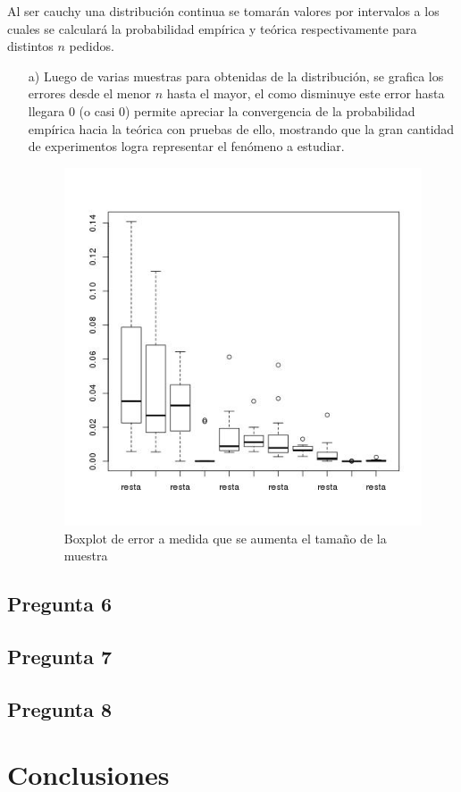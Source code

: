 \documentclass[letter,10pt]{article}
\begin{document}
Al ser cauchy una distribución continua se tomarán valores por intervalos a los cuales se calculará la probabilidad
empírica y teórica respectivamente para distintos $n$ pedidos.
\begin{itemize}
 \item[a)] 
      Luego de varias muestras para obtenidas de la distribución, se grafica los errores desde el menor $n$ hasta el mayor, el como
      disminuye este error hasta llegara 0 (o casi 0) permite apreciar la convergencia de la probabilidad empírica hacia la teórica con pruebas
      de ello, mostrando que la gran cantidad de experimentos logra representar el fenómeno a estudiar.
     
      \begin{figure}[H]
	      \centering
              \includegraphics[width=\linewidth]{p5_boxplot.jpg}
              \caption{Boxplot de error a medida que se aumenta el tamaño de la muestra}
          \end{figure}
      
\end{itemize}

\subsection{Pregunta 6}
\subsection{Pregunta 7}
\subsection{Pregunta 8}




\section{Conclusiones}




%
%

\end{document}
